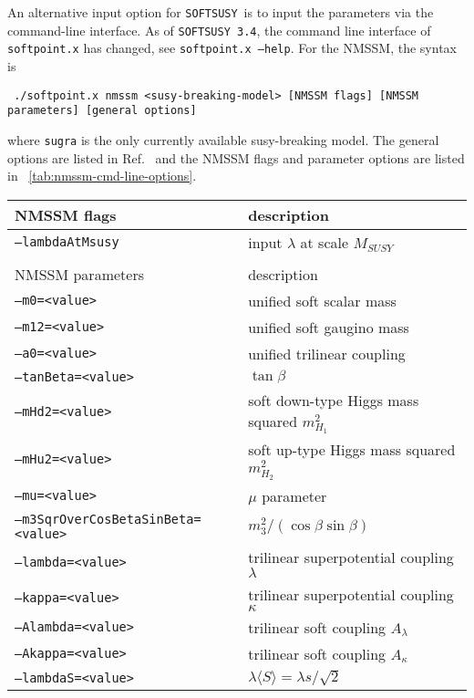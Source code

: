 \documentclass[final,3p,times,pdflatex]{elsarticle}
\def\SOFTSUSY{{\tt SOFTSUSY}}
\def\code#1{\small{\tt #1}\normalsize}
\begin{document}
An alternative input option for \SOFTSUSY\ is to input the parameters via the command-line interface. As of {\tt SOFTSUSY 3.4}, the command line interface of \code{softpoint.x} has
changed, see \code{softpoint.x --help}.  For the NMSSM, the syntax is
%
\small
\begin{verbatim}
 ./softpoint.x nmssm <susy-breaking-model> [NMSSM flags] [NMSSM parameters] [general options]
\end{verbatim}
\normalsize
%
where \code{sugra} is the only currently available susy-breaking
model.  The general options are listed in Ref.~\cite{Allanach:2001kg}
and the NMSSM flags and
parameter options are listed in
\tablename~\ref{tab:nmssm-cmd-line-options}.
%
\begin{table}[tbh]
  \centering
  \begin{tabular}{ll}
    NMSSM flags & description \\
    \hline
    \code{--lambdaAtMsusy} & input $\lambda$ at scale $M_{SUSY}$ \\
    \hline\\
    NMSSM parameters & description \\
    \hline
    \code{--m0=<value>} & unified soft scalar mass \\
    \code{--m12=<value>} & unified soft gaugino mass \\
    \code{--a0=<value>} & unified trilinear coupling \\
    \code{--tanBeta=<value>} & $\tan\beta$ \\
    \code{--mHd2=<value>} & soft down-type Higgs mass squared $m_{H_1}^2$ \\
    \code{--mHu2=<value>} & soft up-type Higgs mass squared $m_{H_2}^2$ \\
    \code{--mu=<value>} & $\mu$ parameter \\
    \code{--m3SqrOverCosBetaSinBeta=<value>} & $m_3^2/(\cos\beta \sin\beta)$ \\
    \code{--lambda=<value>} & trilinear superpotential coupling $\lambda$ \\
    \code{--kappa=<value>} & trilinear superpotential coupling $\kappa$ \\
    \code{--Alambda=<value>} & trilinear soft coupling $A_\lambda$ \\
    \code{--Akappa=<value>} & trilinear soft coupling $A_\kappa$ \\
    \code{--lambdaS=<value>} & $\lambda \langle S \rangle = \lambda s / \sqrt{2}$ \\

\end{tabular}
\end{table}
\end{document}
